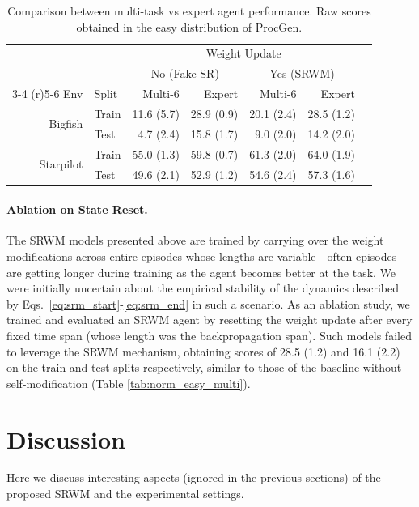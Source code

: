 \documentclass[nohyperref]{article}
\theoremstyle{plain}
\theoremstyle{definition}
\theoremstyle{remark}
\begin{document}
\begin{table}[h]
\setlength{\tabcolsep}{0.4em}
\caption{Comparison between multi-task vs expert agent performance.
Raw scores obtained in the easy distribution of ProcGen.
}
\label{tab:expert}
\begin{center}
\small
\begin{tabular}{rlrrrrr}
\toprule
 &  & \multicolumn{4}{c}{Weight Update} \\ 
 & & \multicolumn{2}{c}{No (Fake SR)} &  \multicolumn{2}{c}{Yes (SRWM)} \\
 \cmidrule(r){3-4} \cmidrule(r){5-6}
Env         & Split & Multi-6 & Expert & Multi-6 & Expert\\ \midrule
\multirow{2}{*}{Bigfish}   & Train & 11.6 (5.7) & 28.9 (0.9)  & 20.1 (2.4) &  28.5 (1.2) \\
          & Test   & 4.7 (2.4) & 15.8 (1.7)  & 9.0 (2.0) &  14.2 (2.0) \\ \midrule
\multirow{2}{*}{Starpilot} & Train & 55.0 (1.3) & 59.8 (0.7)  &  61.3 (2.0) & 64.0 (1.9)  \\
          & Test & 49.6 (2.1)  & 52.9 (1.2)  &  54.6 (2.4) &  57.3 (1.6) \\  
\bottomrule
\end{tabular}
\end{center}
\end{table}

\paragraph{Ablation on State Reset.}
The SRWM models presented above are trained by
carrying over the weight modifications across entire episodes whose lengths are variable---often episodes are getting longer during training as the agent becomes better at the task.
We were initially uncertain about the empirical stability of
the dynamics described by Eqs.~\ref{eq:srm_start}-\ref{eq:srm_end}
in such a scenario.
As an ablation study, we trained and evaluated an SRWM agent by resetting the weight update after every fixed time span (whose length was the backpropagation span).
Such models failed to leverage the SRWM mechanism,
obtaining scores of 28.5 (1.2) and 16.1 (2.2) on the train and test splits respectively, similar to those of the baseline
without self-modification (Table \ref{tab:norm_easy_multi}).

\section{Discussion}
Here we discuss interesting aspects (ignored in the previous sections) of the proposed SRWM and the experimental settings.
\end{document}
